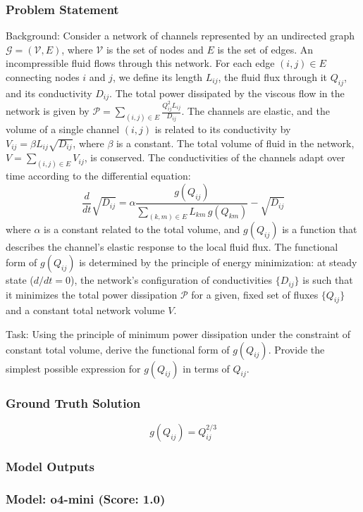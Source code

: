 \documentclass[10pt]{article}
\begin{document}
\subsubsection*{Problem Statement}
Background:
Consider a network of channels represented by an undirected graph $\mathcal{G} = (\mathcal{V}, E)$, where $\mathcal{V}$ is the set of nodes and $E$ is the set of edges. An incompressible fluid flows through this network. For each edge $(i,j) \in E$ connecting nodes $i$ and $j$, we define its length $L_{ij}$, the fluid flux through it $Q_{ij}$, and its conductivity $D_{ij}$. The total power dissipated by the viscous flow in the network is given by $\mathcal{P} = \sum_{(i,j)\in E} \frac{Q_{ij}^2 L_{ij}}{D_{ij}}$. The channels are elastic, and the volume of a single channel $(i,j)$ is related to its conductivity by $V_{ij} = \beta L_{ij} \sqrt{D_{ij}}$, where $\beta$ is a constant. The total volume of fluid in the network, $V = \sum_{(i,j)\in E} V_{ij}$, is conserved. The conductivities of the channels adapt over time according to the differential equation:
$$
\frac{d}{dt}\sqrt{D_{ij}} = \alpha \frac{g(Q_{ij})}{\sum_{(k,m)\in E} L_{km}\, g(Q_{km})} - \sqrt{D_{ij}}
$$
where $\alpha$ is a constant related to the total volume, and $g(Q_{ij})$ is a function that describes the channel's elastic response to the local fluid flux. The functional form of $g(Q_{ij})$ is determined by the principle of energy minimization: at steady state ($d/dt = 0$), the network's configuration of conductivities $\{D_{ij}\}$ is such that it minimizes the total power dissipation $\mathcal{P}$ for a given, fixed set of fluxes $\{Q_{ij}\}$ and a constant total network volume $V$.

Task:
Using the principle of minimum power dissipation under the constraint of constant total volume, derive the functional form of $g(Q_{ij})$. Provide the simplest possible expression for $g(Q_{ij})$ in terms of $Q_{ij}$.

\subsubsection*{Ground Truth Solution}
\[ \boxed{g(Q_{ij}) = Q_{ij}^{2/3}} \]

\subsubsection*{Model Outputs}
\subsubsection*{Model: o4-mini (Score: 1.0)}
\end{document}

